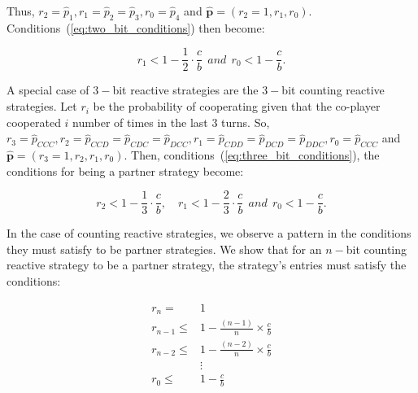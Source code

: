 \documentclass{article}
\theoremstyle{definition}
\begin{document}
Thus, $r_2 = \hat{p}_1, r_1 = \hat{p}_2 =  \hat{p}_3, r_0 = \hat{p}_4$ and
$\mathbf{\hat{p}}=(r_2=1, r_1, r_0)$. Conditions~(\ref{eq:two_bit_conditions})
then become:

\begin{equation}\label{eq:counting_two_bit_conditions}
  \displaystyle r_1 < 1-\frac{1}{2} \cdot \frac{c}{b} ~~and~~ r_0 < 1\!-\! \frac{c}{b}.
\end{equation}


A special case of $3-$bit reactive strategies are the $3-$bit counting reactive
strategies. Let $r_i$ be the probability of cooperating given that the co-player
cooperated $i$ number of times in the last 3 turns. So, $r_3 = \hat{p}_{CCC},
r_2 = \hat{p}_{CCD} =  \hat{p}_{CDC} = \hat{p}_{DCC}, r_1 = \hat{p}_{CDD} =
\hat{p}_{DCD} =  \hat{p}_{DDC}, r_0 = \hat{p}_{CCC}$ and $\mathbf{\hat{p}}=(r_3=1,
r_2, r_1, r_0)$. Then, conditions~(\ref{eq:three_bit_conditions}), the
conditions for being a partner strategy become:

\begin{equation}\label{eq:counting_three_bit_conditions}
  \displaystyle r_2 < 1- \frac{1}{3} \cdot \frac{c}{b}, \quad r_1 < 1- \frac{2}{3} \cdot \frac{c}{b} ~~and~~ r_0 < 1\!-\! \frac{c}{b}.
\end{equation}


In the case of counting reactive strategies, we observe a pattern in the
conditions they must satisfy to be partner strategies. We show that for an $n-$bit
counting reactive strategy to be a partner strategy, the strategy's entries must
satisfy the conditions:

\begin{align*}
    r_{n}   = & 1 \\
    r_{n-1} \leq & 1  - \frac{(n - 1)}{n} \times \frac{c}{b}\\
    r_{n-2} \leq & 1  - \frac{(n - 2)}{n} \times \frac{c}{b}\\
    & \vdots \\
    r_{0} \leq &  1  - \frac{c}{b}\\
\end{align*}

~\\

\end{document}
